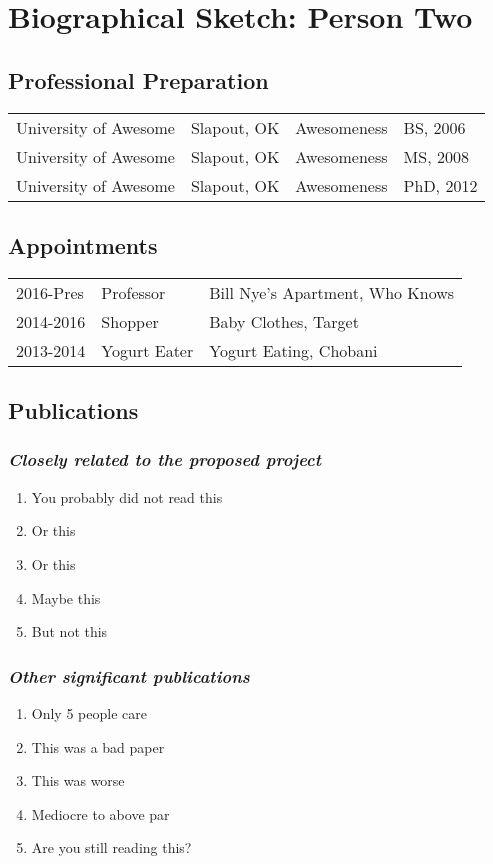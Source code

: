 \setcounter{subsection}{0}
\renewcommand\thesubsection{(\alph{subsection})}
\renewcommand\thesubsubsection{\textit{(\roman{subsubsection})}}

\section*{Biographical Sketch: Person Two}

\subsection{Professional Preparation}
\begin{tabular}[c]{llll}
University of Awesome & Slapout, OK & Awesomeness & BS, 2006\\
University of Awesome & Slapout, OK & Awesomeness & MS, 2008\\
University of Awesome & Slapout, OK & Awesomeness & PhD, 2012\\
\end{tabular}

\subsection{Appointments}
\begin{tabularx}{\textwidth}{ l l Y }
2016-Pres & Professor & Bill Nye's Apartment, Who Knows \\
2014-2016 & Shopper & Baby Clothes, Target \\
2013-2014 & Yogurt Eater & Yogurt Eating, Chobani \\
\end{tabularx}

\subsection{Publications}
\subsubsection{\textit{Closely related to the proposed project}}
\begin{enumerate}
\item You probably did not read this
\item Or this
\item Or this
\item Maybe this
\item But not this
\end{enumerate}
\subsubsection{\textit{Other significant publications}}
\begin{enumerate}
\item Only 5 people care
\item This was a bad paper
\item This was worse
\item Mediocre to above par
\item Are you still reading this?
\end{enumerate}

